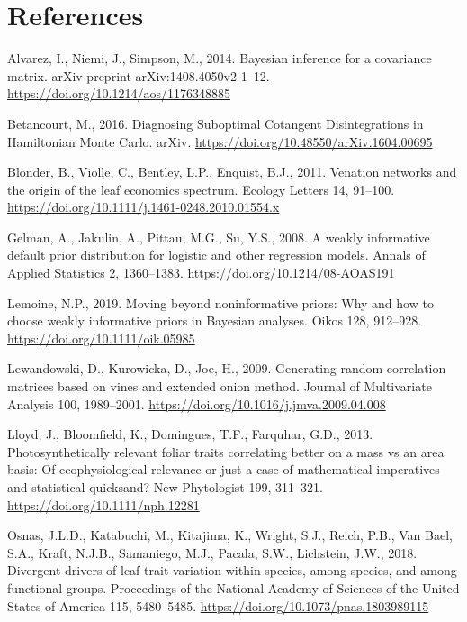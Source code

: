 \documentclass[
  12pt,
  letterpaper,
  DIV=11,
  numbers=noendperiod]{scrartcl}
\newlength{\cslhangindent}
\newenvironment{CSLReferences}[2] %
 {\begin{list}{}{%
  \setlength{\itemindent}{0pt}
  \setlength{\leftmargin}{0pt}
  \setlength{\parsep}{0pt}
  \ifodd #1
   \setlength{\leftmargin}{\cslhangindent}
   \setlength{\itemindent}{-1\cslhangindent}
  \fi
  \setlength{\itemsep}{#2\baselineskip}}}
 {\end{list}}
\numberwithin{equation}{section}
\begin{document}
\newpage

\section*{References}\label{references}

\label{refs}
\begin{CSLReferences}{1}{0}
Alvarez, I., Niemi, J., Simpson, M., 2014. Bayesian inference for a
covariance matrix. arXiv preprint arXiv:1408.4050v2 1--12.
\url{https://doi.org/10.1214/aos/1176348885}

Betancourt, M., 2016. Diagnosing {Suboptimal Cotangent Disintegrations}
in {Hamiltonian Monte Carlo}. arXiv.
\url{https://doi.org/10.48550/arXiv.1604.00695}

Blonder, B., Violle, C., Bentley, L.P., Enquist, B.J., 2011. Venation
networks and the origin of the leaf economics spectrum. Ecology Letters
14, 91--100. \url{https://doi.org/10.1111/j.1461-0248.2010.01554.x}

Gelman, A., Jakulin, A., Pittau, M.G., Su, Y.S., 2008. A weakly
informative default prior distribution for logistic and other regression
models. Annals of Applied Statistics 2, 1360--1383.
\url{https://doi.org/10.1214/08-AOAS191}

Lemoine, N.P., 2019. Moving beyond noninformative priors: Why and how to
choose weakly informative priors in {Bayesian} analyses. Oikos 128,
912--928. \url{https://doi.org/10.1111/oik.05985}

Lewandowski, D., Kurowicka, D., Joe, H., 2009. Generating random
correlation matrices based on vines and extended onion method. Journal
of Multivariate Analysis 100, 1989--2001.
\url{https://doi.org/10.1016/j.jmva.2009.04.008}

Lloyd, J., Bloomfield, K., Domingues, T.F., Farquhar, G.D., 2013.
Photosynthetically relevant foliar traits correlating better on a mass
vs an area basis: {Of} ecophysiological relevance or just a case of
mathematical imperatives and statistical quicksand? New Phytologist 199,
311--321. \url{https://doi.org/10.1111/nph.12281}

Osnas, J.L.D., Katabuchi, M., Kitajima, K., Wright, S.J., Reich, P.B.,
Van Bael, S.A., Kraft, N.J.B., Samaniego, M.J., Pacala, S.W., Lichstein,
J.W., 2018. Divergent drivers of leaf trait variation within species,
among species, and among functional groups. Proceedings of the National
Academy of Sciences of the United States of America 115, 5480--5485.
\url{https://doi.org/10.1073/pnas.1803989115}


\end{CSLReferences}
\end{document}

